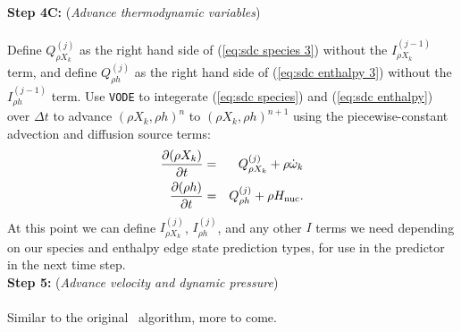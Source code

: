 {\bf Step 4C:} ({\it Advance thermodynamic variables})\\ \\
Define $Q_{\rho X_k}^{(j)}$ as the right hand side of (\ref{eq:sdc species 3}) without the $I_{\rho X_k}^{(j-1)}$ term, and define $Q_{\rho h}^{(j)}$ as the right hand side of (\ref{eq:sdc enthalpy 3}) without the $I_{\rho h}^{(j-1)}$ term.  Use {\tt VODE} to integerate (\ref{eq:sdc species}) and (\ref{eq:sdc enthalpy}) over $\Delta t$ to advance $(\rho X_k, \rho h)^n$ to $(\rho X_k, \rho h)^{n+1}$ using the piecewise-constant advection and diffusion source terms:
\begin{eqnarray}
\frac{\partial(\rho X_k)}{\partial t} &=& Q_{\rho X_k}^{(j)} + \rho\dot\omega_k\\
\frac{\partial(\rho h)}{\partial t} &=& Q_{\rho h}^{(j)} + \rho{H_{\rm nuc}}.
\end{eqnarray}
At this point we can define $I_{\rho X_k}^{(j)}$, $I_{\rho h}^{(j)}$, and any other $I$ terms we need depending on 
our species and enthalpy edge state prediction types, for use in the predictor in the next time step.\\

{\bf Step 5:} ({\it Advance velocity and dynamic pressure})\\ \\
Similar to the original \maestro\ algorithm, more to come.
